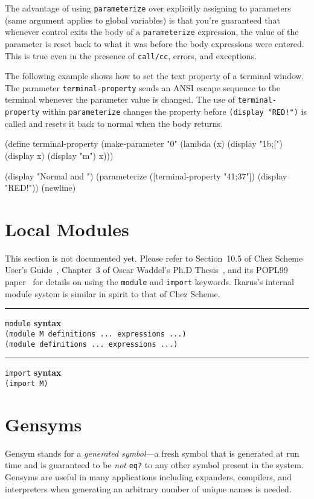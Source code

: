 \documentclass[onecolumn, 12pt, twoside, openright, dvipdfm]{book}
\makeatletter
\newcommand{\idxdefun}[3]{
\vspace{1ex}
\rule{\textwidth}{2pt}
{\index{#1@\texttt{#2}}\label{#1}{\Large\texttt{#2}} \hfill \textbf{#3}}\\
}
\newcommand{\defun}[2]{\idxdefun{#1}{#1}{#2}}
\makeatother
\begin{document}
The advantage of using \texttt{parameterize} over explicitly
assigning to parameters (same argument applies to global variables)
is that you're guaranteed that whenever control exits the body of a
\texttt{parameterize} expression, the value of the parameter is
reset back to what it was before the body expressions were entered.
This is true even in the presence of \texttt{call/cc}, errors, and
exceptions.

The following example shows how to set the text property of a
terminal window.  The parameter \texttt{terminal-property} sends an
ANSI escape sequence to the terminal whenever the parameter value is
changed.  The use of \texttt{terminal-property} within
\texttt{parameterize} changes the property before
\texttt{(display~"RED!")} is called and resets it back to normal
when the body returns.

\begin{CodeInline}
(define terminal-property
  (make-parameter "0"
    (lambda (x)
      (display "\x1b;[")
      (display x)
      (display "m")
      x)))

(display "Normal and ")
(parameterize ([terminal-property "41;37"])
  (display "RED!"))
(newline)
\end{CodeInline}



\newpage
\section{Local Modules}

This section is not documented yet.
Please refer to Section~10.5 of Chez Scheme
User's Guide~\cite{csug7}, Chapter~3 of Oscar Waddel's Ph.D
Thesis~\cite{waddell-thesis}, and its POPL99
paper~\cite{waddell-extending} for details on using the
\texttt{module} and \texttt{import} keywords.  Ikarus's internal
module system is similar in spirit to that of Chez Scheme.


\defun{module}{syntax}
\texttt{(module M definitions ... expressions ...)}\\
\texttt{(module definitions ... expressions ...)}

\defun{import}{syntax}
\texttt{(import M)}

\newpage
\section{\label{sec:gensyms}Gensyms}

Gensym stands for a \emph{generated symbol}---a fresh symbol that is
generated at run time and is guaranteed to be \emph{not}
\texttt{eq?} to any other symbol present in the system.  Gensyms are
useful in many applications including expanders, compilers, and
interpreters when generating an arbitrary number of unique names is
needed.
\end{document}
